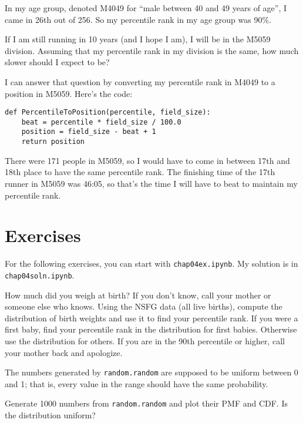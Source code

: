 \documentclass[12pt]{book}
\begin{document}
In my age group, denoted M4049 for ``male between 40 and 49 years of
age'', I came in 26th out of 256.  So my percentile rank in my age
group was 90\%.

If I am still running in 10 years (and I hope I am), I will be in
the M5059 division.  Assuming that my percentile rank in my division
is the same, how much slower should I expect to be?

I can answer that question by converting my percentile rank in M4049
to a position in M5059.  Here's the code:

\begin{verbatim}
def PercentileToPosition(percentile, field_size):
    beat = percentile * field_size / 100.0
    position = field_size - beat + 1
    return position
\end{verbatim}

There were 171 people in M5059, so I would have to come in between
17th and 18th place to have the same percentile rank.  The finishing
time of the 17th runner in M5059 was 46:05, so that's the time I will
have to beat to maintain my percentile rank.


\section{Exercises}

For the following exercises, you can start with \verb"chap04ex.ipynb".
My solution is in \verb"chap04soln.ipynb".

\begin{exercise}
How much did you weigh at birth?  If you don't know, call your mother
or someone else who knows.  Using the NSFG data (all live births),
compute the distribution of birth weights and use it to find your
percentile rank.  If you were a first baby, find your percentile rank
in the distribution for first babies.  Otherwise use the distribution
for others.  If you are in the 90th percentile or higher, call your
mother back and apologize.

\end{exercise}

\begin{exercise}
The numbers generated by {\tt random.random} are supposed to be
uniform between 0 and 1; that is, every value in the range
should have the same probability.

Generate 1000 numbers from {\tt random.random} and plot their
PMF and CDF.  Is the distribution uniform?

\end{exercise}
\end{document}
